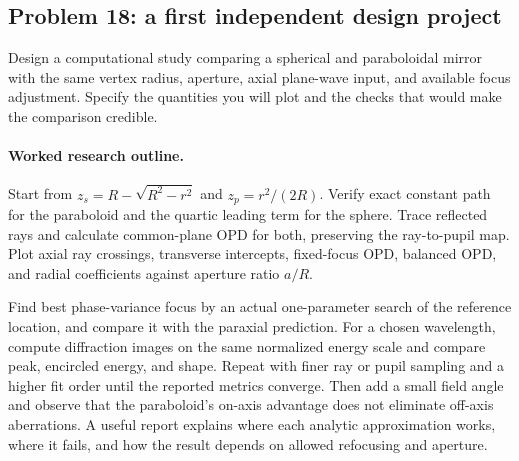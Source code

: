 \subsection*{Problem 18: a first independent design project}
Design a computational study comparing a spherical and paraboloidal
mirror with the same vertex radius, aperture, axial plane-wave input,
and available focus adjustment. Specify the quantities you will plot
and the checks that would make the comparison credible.

\paragraph{Worked research outline.}
Start from $z_s=R-\sqrt{R^2-r^2}$ and $z_p=r^2/(2R)$.
Verify exact constant path for the paraboloid and the quartic leading
term for the sphere. Trace reflected rays and calculate common-plane
OPD for both, preserving the ray-to-pupil map. Plot axial ray crossings,
transverse intercepts, fixed-focus OPD, balanced OPD, and radial
coefficients against aperture ratio $a/R$.

Find best phase-variance focus by an actual one-parameter search of
the reference location, and compare it with the paraxial prediction.
For a chosen wavelength, compute diffraction images on the same
normalized energy scale and compare peak, encircled energy, and shape.
Repeat with finer ray or pupil sampling and a higher fit order until
the reported metrics converge. Then add a small field angle and
observe that the paraboloid's on-axis advantage does not eliminate
off-axis aberrations. A useful report explains where each analytic
approximation works, where it fails, and how the result depends on
allowed refocusing and aperture.

